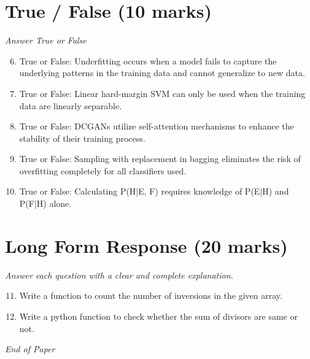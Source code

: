 \documentclass[12pt]{article}
\begin{document}
\section*{True / False (10 marks)}
\textit{Answer True or False}
\begin{enumerate}[label=\arabic*.]
\setcounter{enumi}{5}
\item True or False: Underfitting occurs when a model fails to capture the underlying patterns in the training data and cannot generalize to new data.
\item True or False: Linear hard-margin SVM can only be used when the training data are linearly separable.
\item True or False: DCGANs utilize self-attention mechanisms to enhance the stability of their training process.
\item True or False: Sampling with replacement in bagging eliminates the risk of overfitting completely for all classifiers used.
\item True or False: Calculating P(H|E, F) requires knowledge of P(E|H) and P(F|H) alone.
\end{enumerate}

\section*{Long Form Response (20 marks)}
\textit{Answer each question with a clear and complete explanation.}
\begin{enumerate}[label=\arabic*.]
\setcounter{enumi}{10}
\item Write a function to count the number of inversions in the given array.
\item Write a python function to check whether the sum of divisors are same or not.
\end{enumerate}

\vfill
\noindent\textit{End of Paper}
\end{document}
